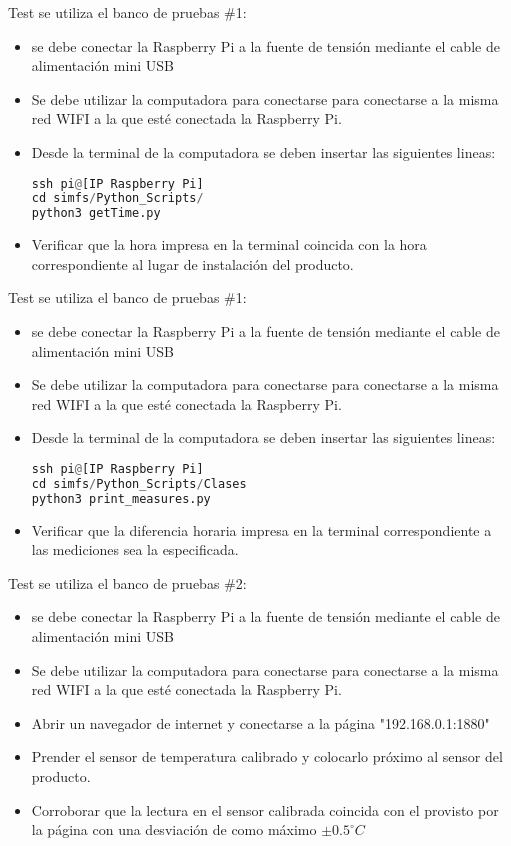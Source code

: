 
Test \TBC se utiliza el banco de pruebas \#1:
\begin{itemize}
\item se debe conectar la Raspberry Pi a la fuente de tensión mediante el cable de alimentación mini USB
\item Se debe utilizar la computadora para conectarse para conectarse a la misma red WIFI a la que esté conectada la Raspberry Pi.
\item Desde la terminal de la computadora se deben insertar las siguientes lineas:
\begin{lstlisting}[language=Python]
ssh pi@[IP Raspberry Pi] 
cd simfs/Python_Scripts/
python3 getTime.py
\end{lstlisting}
\item Verificar que la hora impresa en la terminal coincida con la hora correspondiente al lugar de instalación del producto.
\end{itemize}

Test \TBC se utiliza el banco de pruebas \#1:
\begin{itemize}
\item se debe conectar la Raspberry Pi a la fuente de tensión mediante el cable de alimentación mini USB
\item Se debe utilizar la computadora para conectarse para conectarse a la misma red WIFI a la que esté conectada la Raspberry Pi.
\item Desde la terminal de la computadora se deben insertar las siguientes lineas:
\begin{lstlisting}[language=Python]
ssh pi@[IP Raspberry Pi] 
cd simfs/Python_Scripts/Clases
python3 print_measures.py
\end{lstlisting}
\item Verificar que la diferencia horaria impresa en la terminal correspondiente a las mediciones sea la especificada.
\end{itemize}


Test \TBC se utiliza el banco de pruebas \#2:
\begin{itemize}
\item se debe conectar la Raspberry Pi a la fuente de tensión mediante el cable de alimentación mini USB
\item Se debe utilizar la computadora para conectarse para conectarse a la misma red WIFI a la que esté conectada la Raspberry Pi.
\item Abrir un navegador de internet y conectarse a la página "192.168.0.1:1880"
\item Prender el sensor de temperatura calibrado y colocarlo próximo al sensor del producto.
\item Corroborar que la lectura en el sensor calibrada coincida con el provisto por la página con una desviación de como máximo  $ \pm 0.5^\circ C $
\end{itemize}

